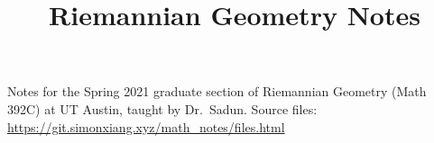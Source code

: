 \documentclass[fontsize=9pt]{article}
\title{Riemannian Geometry Notes}
\begin{document}
\maketitle
Notes for the Spring 2021 graduate section of Riemannian Geometry (Math 392C) at UT Austin, taught by Dr.\ Sadun. Source files: \url{https://git.simonxiang.xyz/math_notes/files.html}
\tableofcontents
\newpage
    
    
    
    
    
    
\end{document}
